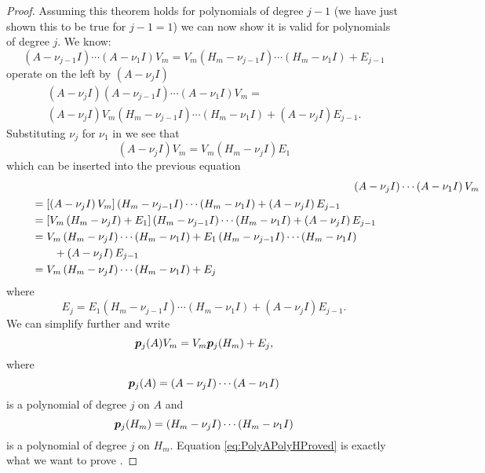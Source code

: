 \begin{proof}
Assuming this theorem holds for polynomials of degree $j-1$ (we have just shown this to be true for $j-1=1$) we can now show it is valid for polynomials of degree $j$.  We know:
\begin{equation}
        \left(A-\nu_{j-1}I\right)\cdots\left(A-\nu_1I\right)V_m = V_m\left(H_m-\nu_{j-1}I\right)\cdots\left(H_m-\nu_1I\right) + E_{j-1}
\end{equation}
operate on the left by $\left( A-\nu_jI \right)$
\begin{multline}
    \left(A-\nu_jI\right)\left(A-\nu_{j-1}I\right)\cdots\left(A-\nu_1I\right)V_m =  \\
    \left(A-\nu_jI\right)V_m\left(H_m-\nu_{j-1}I\right)\cdots\left(H_m-\nu_1I\right) + \left(A-\nu_jI\right)E_{j-1}.
\end{multline}
Substituting $\nu_j$ for $\nu_1$ in  we see that
\begin{equation}
    \left(A-\nu_j I\right)V_m = V_m\left(H_m - \nu_j I\right) E_1
    \label{eq:ArnoldiPolynomialDegreej}
\end{equation}
which can be inserted into the previous equation
\begin{align}
    \lefteqn{\left(A-\nu_jI\right)\cdots\left(A-\nu_1I\right)V_m} \qquad \nonumber \\
    \begin{split}
    &= \left[ \left(A-\nu_jI\right)V_m \right]\left(H_m-\nu_{j-1}I\right)\cdots\left(H_m-\nu_1I\right) + \left(A-\nu_jI\right)E_{j-1} \\
     &= \left[ V_m\left(H_m-\nu_jI\right)+E_1 \right]\left(H_m-\nu_{j-1}I\right)\cdots\left(H_m-\nu_1I\right) + \left(A-\nu_jI\right)E_{j-1} \\
     &= V_m\left(H_m-\nu_jI\right)\cdots\left(H_m-\nu_1I\right) + E_1\left(H_m - \nu_{j-1}I\right)\cdots\left(H_m - \nu_1I\right) \\
     &\qquad + \left(A-\nu_jI\right)E_{j-1} \\
     &= V_m\left(H_m-\nu_jI\right)\cdots\left(H_m-\nu_1I\right) + E_j
     \label{eq:PolyAPolyHProof}
    \end{split}
\end{align}
where 
\begin{equation}
    \label{eq:Ej}
    E_j = E_1\left(H_m - \nu_{j-1}I\right)\cdots\left(H_m - \nu_1I\right) + \left(A-\nu_jI\right)E_{j-1}.
\end{equation}
We can simplify  further and write
\begin{equation}
    \bm{p}_j(A)V_m = V_m\bm{p}_j(H_m) + E_j,
    \label{eq:PolyAPolyHProved}
\end{equation}
where \[\bm{p}_j(A) = \left(A-\nu_jI\right)\cdots\left(A-\nu_1I\right)\] is a polynomial of degree $j$ on $A$ and \[\bm{p}_j(H_m) = \left(H_m-\nu_jI\right)\cdots\left(H_m-\nu_1I\right)\] is a polynomial of degree $j$ on $H_m$.  Equation \eqref{eq:PolyAPolyHProved} is exactly what we want to prove .


\end{proof}
